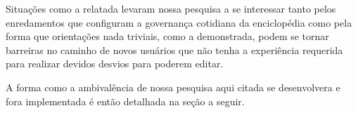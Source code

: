 Situações como a relatada levaram nossa pesquisa a se interessar tanto pelos enredamentos que configuram a governança cotidiana da enciclopédia como pela forma que orientações nada triviais, como a demonstrada, podem se tornar barreiras no caminho de novos usuários que não tenha a experiência requerida para realizar devidos desvios para poderem editar.

A forma como a ambivalência de nossa pesquisa aqui citada se desenvolvera e fora implementada é então detalhada na seção a seguir.